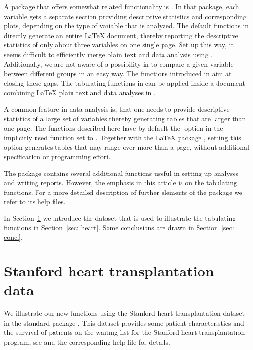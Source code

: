 \documentclass[nojss]{jss}\usepackage[]{graphicx}\usepackage[]{color}
\begin{document}
A package that offers somewhat related functionality is  \citep{r2lUniv}.
In that package, each variable gets a separate section providing descriptive statistics and corresponding plots, 
depending on the type of variable that is analyzed. The default functions in 
directly generate an entire {\LaTeX} document, thereby reporting the descriptive statistics of only about three variables
on one single page. Set up this way, it seems difficult to efficiently merge plain text and data analysis using .
Additionally, we are not aware of a possibility in  to compare a given variable between different groups in an
easy way. The functions introduced in  aim at closing these gaps. The tabulating functions 
in  can be applied inside a  document combining {\LaTeX} plain text and data 
analyses in .

A common feature in data analysis is, that one needs to provide descriptive statistics of a large set of variables thereby
generating tables that are larger than one page. The functions described here have by default 
the -option
in the implicitly used  function  set to . Together
with the {\LaTeX} package , setting this option generates tables that may range over more than a 
page, without additional specification or programming effort.

The package  contains several additional functions useful in setting up analyses and 
writing reports. However, the emphasis in this article is on the tabulating functions. For a more detailed description
of further elements of the package we refer to its  help files.

In Section~\ref{sec: data} we introduce the dataset that is used to illustrate the tabulating functions 
in Section~\ref{sec: heart}. Some conclusions are drawn in Section~\ref{sec: concl}.

\section{Stanford heart transplantation data} \label{sec: data}
We illustrate our new functions using the Stanford heart transplantation dataset  in the 
standard  package  \citep{survival}. 
This dataset provides some patient characteristics and the survival of patients on the waiting list for the 
Stanford heart transplantation program, see \cite{crowley_77} and the corresponding  help file for details.
\end{document}
